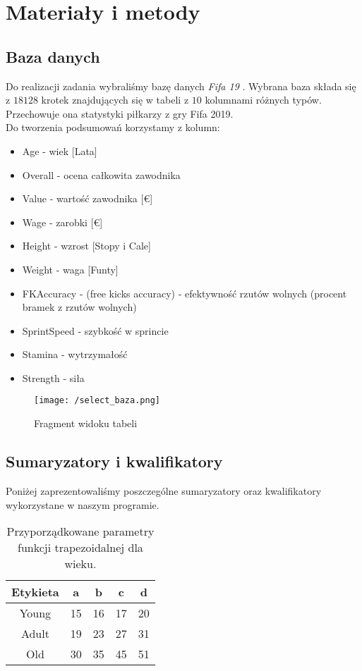 \documentclass{classrep}
\begin{document}
\section{Materiały i metody}
\subsection{Baza danych}
Do realizacji zadania wybraliśmy bazę danych \emph{Fifa 19} \cite{data}. Wybrana baza
składa się z \(18128\) krotek znajdujących się w tabeli z \(10\) kolumnami różnych typów. Przechowuje ona statystyki piłkarzy z gry Fifa 2019.\\ Do tworzenia podsumowań
korzystamy z kolumn:
\begin{itemize}
    \item Age - wiek [Lata]
    \item Overall - ocena całkowita zawodnika
    \item Value - wartość zawodnika [\euro]
    \item Wage - zarobki [\euro]
    \item Height - wzrost [Stopy i Cale]
    \item Weight - waga [Funty]
    \item FKAccuracy - (free kicks accuracy) - efektywność rzutów wolnych (procent bramek z rzutów wolnych)
    \item SprintSpeed - szybkość w sprincie
    \item Stamina - wytrzymałość
    \item Strength - siła
\end{itemize}

\begin{figure}[H]
    \centering
    \texttt{[image: /select\_baza.png]}
    \caption{Fragment widoku tabeli}
\end{figure}
\subsection{Sumaryzatory i kwalifikatory}
Poniżej zaprezentowaliśmy poszczególne sumaryzatory oraz kwalifikatory wykorzystane w naszym programie. 

\begin{table}[H]
	\centering
	\begin{tabular}{c c c c c} 
		\hline
		\textbf{Etykieta} & \textbf{a} & \textbf{b} & \textbf{c} &  \textbf{d} \\ [0.5ex] 
		\hline
		\hline 
		Young & 15 & 16 & 17 & 20 \\ 
		Adult & 19 &  23 &  27 &  31 \\
		Old &  30 &  35 &  45 &  51 \\
		\hline
	\end{tabular}
	\caption{Przyporządkowane parametry funkcji trapezoidalnej dla wieku.}
\end{table}
\end{document}
